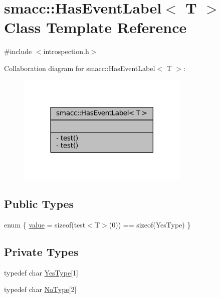 \hypertarget{classsmacc_1_1HasEventLabel}{}\section{smacc\+:\+:Has\+Event\+Label$<$ T $>$ Class Template Reference}
\label{classsmacc_1_1HasEventLabel}


{\ttfamily \#include $<$introspection.\+h$>$}



Collaboration diagram for smacc\+:\+:Has\+Event\+Label$<$ T $>$\+:
\nopagebreak
\begin{figure}[H]
\begin{center}
\leavevmode
\includegraphics[width=233pt]{classsmacc_1_1HasEventLabel__coll__graph}
\end{center}
\end{figure}
\subsection*{Public Types}
\begin{DoxyCompactItemize}
\item 
enum \{ \hyperlink{classsmacc_1_1HasEventLabel_a7aa204bcf7a7faf203081f1eaf577bf5afb831cdba5590b0dd7a722637b8a1125}{value} = sizeof(test$<$T$>$(0)) == sizeof(Yes\+Type)
 \}
\end{DoxyCompactItemize}
\subsection*{Private Types}
\begin{DoxyCompactItemize}
\item 
typedef char \hyperlink{classsmacc_1_1HasEventLabel_a7baf4f99540d64553d8bba388b77fb25}{Yes\+Type}\mbox{[}1\mbox{]}
\item 
typedef char \hyperlink{classsmacc_1_1HasEventLabel_a95929e58f14e06acf98ddcb5dec21f6b}{No\+Type}\mbox{[}2\mbox{]}
\end{DoxyCompactItemize}
